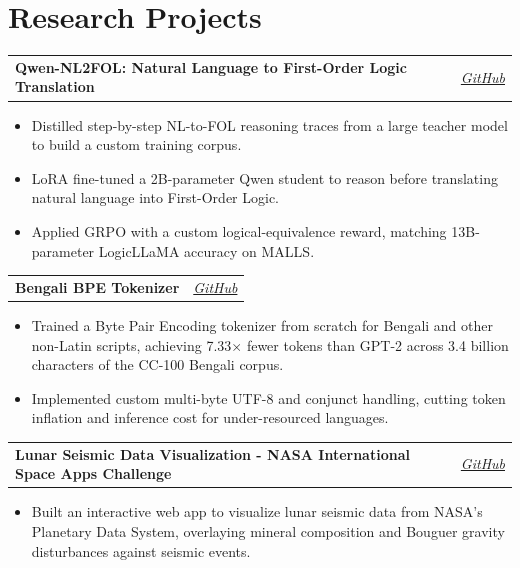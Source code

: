 \documentclass[10pt]{article}
\makeatletter
\newcommand{\entry}[2]{%
  \noindent\begin{tabularx}{\linewidth}{@{}X r@{}}
    \textbf{#1} & \textit{\small #2}
  \end{tabularx}\vspace{-1pt}
}
\makeatother
\begin{document}
\vspace{5pt}


\section{Research Projects}

\entry{Qwen-NL2FOL: Natural Language to First-Order Logic Translation}{\href{https://github.com/nawaz0x1/Qwen-NL2FOL}{GitHub}}
\begin{itemize}
  \item Distilled step-by-step NL-to-FOL reasoning traces from a large teacher model to build a custom training corpus.
  \item LoRA fine-tuned a 2B-parameter Qwen student to reason before translating natural language into First-Order Logic.
  \item Applied GRPO with a custom logical-equivalence reward, matching 13B-parameter LogicLLaMA accuracy on MALLS.
\end{itemize}
\vspace{4pt}

\entry{Bengali BPE Tokenizer}{\href{https://github.com/nawaz0x1/Bengali-BPE-Tokenizer}{GitHub}}
\begin{itemize}
  \item Trained a Byte Pair Encoding tokenizer from scratch for Bengali and other non-Latin scripts, achieving 7.33$\times$ fewer tokens than GPT-2 across 3.4 billion characters of the CC-100 Bengali corpus.
  \item Implemented custom multi-byte UTF-8 and conjunct handling, cutting token inflation and inference cost for under-resourced languages.
\end{itemize}
\vspace{4pt}

\entry{Lunar Seismic Data Visualization - NASA International Space Apps Challenge}{\href{https://github.com/nawaz0x1/LunaWave}{GitHub}}
\begin{itemize}
  \item Built an interactive web app to visualize lunar seismic data from NASA's Planetary Data System, overlaying mineral composition and Bouguer gravity disturbances against seismic events.
\end{itemize}

\end{document}
